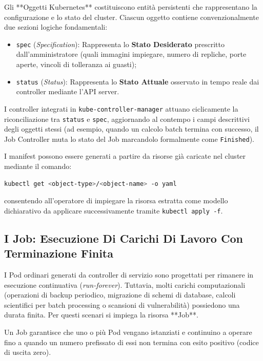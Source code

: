 \documentclass[11pt, a4paper]{article}
\begin{document}
Gli **Oggetti Kubernetes** costituiscono entità persistenti che rappresentano la configurazione e lo stato del cluster. Ciascun oggetto contiene convenzionalmente due sezioni logiche fondamentali:
\begin{itemize}[noitemsep]
    \item \texttt{spec} (\emph{Specification}): Rappresenta lo \textbf{Stato Desiderato} prescritto dall'amministratore (quali immagini impiegare, numero di repliche, porte aperte, vincoli di tolleranza ai guasti);
    \item \texttt{status} (\emph{Status}): Rappresenta lo \textbf{Stato Attuale} osservato in tempo reale dai controller mediante l'API server.
\end{itemize}

I controller integrati in \texttt{kube-controller-manager} attuano ciclicamente la riconciliazione tra \texttt{status} e \texttt{spec}, aggiornando al contempo i campi descrittivi degli oggetti stessi (ad esempio, quando un calcolo batch termina con successo, il Job Controller muta lo stato del Job marcandolo formalmente come \texttt{Finished}).

I manifest possono essere generati a partire da risorse già caricate nel cluster mediante il comando:
\begin{lstlisting}[language=bash]
kubectl get <object-type>/<object-name> -o yaml
\end{lstlisting}
consentendo all'operatore di impiegare la risorsa estratta come modello dichiarativo da applicare successivamente tramite \texttt{kubectl apply -f}.

\subsection{I Job: Esecuzione Di Carichi Di Lavoro Con Terminazione Finita}
I Pod ordinari generati da controller di servizio sono progettati per rimanere in esecuzione continuativa (\emph{run-forever}). Tuttavia, molti carichi computazionali (operazioni di backup periodico, migrazione di schemi di database, calcoli scientifici per batch processing o scansioni di vulnerabilità) possiedono una durata finita. Per questi scenari si impiega la risorsa **Job**.

Un Job garantisce che uno o più Pod vengano istanziati e continuino a operare fino a quando un numero prefissato di essi non termina con esito positivo (codice di uscita zero).
\end{document}
